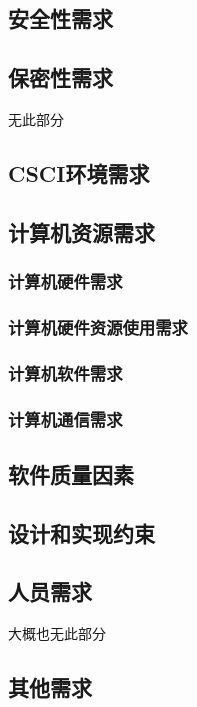 \subsection{安全性需求}

\subsection{保密性需求}
无此部分

\subsection{CSCI环境需求}

\subsection{计算机资源需求}
\subsubsection{计算机硬件需求}

\subsubsection{计算机硬件资源使用需求}

\subsubsection{计算机软件需求}

\subsubsection{计算机通信需求}

\subsection{软件质量因素}

\subsection{设计和实现约束}

\subsection{人员需求}
大概也无此部分

\subsection{其他需求}



\endinput